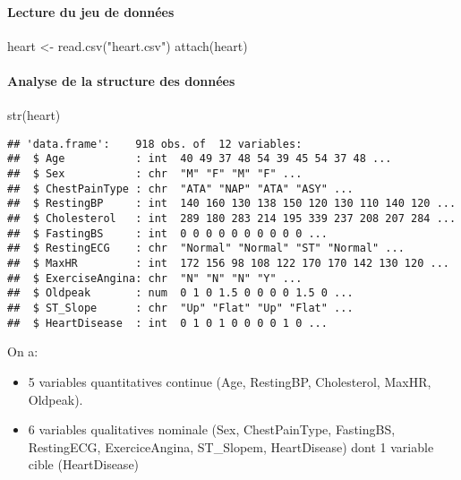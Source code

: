 \documentclass[
]{article}
\newenvironment{Shaded}{\begin{snugshade}}{\end{snugshade}}
\newcommand{\FunctionTok}[1]{\textcolor[rgb]{0.00,0.00,0.00}{#1}}
\newcommand{\NormalTok}[1]{#1}
\newcommand{\OtherTok}[1]{\textcolor[rgb]{0.56,0.35,0.01}{#1}}
\newcommand{\StringTok}[1]{\textcolor[rgb]{0.31,0.60,0.02}{#1}}
\providecommand{\tightlist}{%
  \setlength{\itemsep}{0pt}\setlength{\parskip}{0pt}}
\begin{document}
\hypertarget{lecture-du-jeu-de-donnuxe9es}{%
\paragraph{Lecture du jeu de
données}\label{lecture-du-jeu-de-donnuxe9es}}

\begin{Shaded}
\begin{Highlighting}[]
\NormalTok{heart }\OtherTok{\textless{}{-}} \FunctionTok{read.csv}\NormalTok{(}\StringTok{"heart.csv"}\NormalTok{)}
\FunctionTok{attach}\NormalTok{(heart)}
\end{Highlighting}
\end{Shaded}

\hypertarget{analyse-de-la-structure-des-donnuxe9es}{%
\paragraph{Analyse de la structure des
données}\label{analyse-de-la-structure-des-donnuxe9es}}

\begin{Shaded}
\begin{Highlighting}[]
\FunctionTok{str}\NormalTok{(heart)}
\end{Highlighting}
\end{Shaded}

\begin{verbatim}
## 'data.frame':    918 obs. of  12 variables:
##  $ Age           : int  40 49 37 48 54 39 45 54 37 48 ...
##  $ Sex           : chr  "M" "F" "M" "F" ...
##  $ ChestPainType : chr  "ATA" "NAP" "ATA" "ASY" ...
##  $ RestingBP     : int  140 160 130 138 150 120 130 110 140 120 ...
##  $ Cholesterol   : int  289 180 283 214 195 339 237 208 207 284 ...
##  $ FastingBS     : int  0 0 0 0 0 0 0 0 0 0 ...
##  $ RestingECG    : chr  "Normal" "Normal" "ST" "Normal" ...
##  $ MaxHR         : int  172 156 98 108 122 170 170 142 130 120 ...
##  $ ExerciseAngina: chr  "N" "N" "N" "Y" ...
##  $ Oldpeak       : num  0 1 0 1.5 0 0 0 0 1.5 0 ...
##  $ ST_Slope      : chr  "Up" "Flat" "Up" "Flat" ...
##  $ HeartDisease  : int  0 1 0 1 0 0 0 0 1 0 ...
\end{verbatim}

On a:

\begin{itemize}
\tightlist
\item
  5 variables quantitatives continue (Age, RestingBP, Cholesterol,
  MaxHR, Oldpeak).
\item
  6 variables qualitatives nominale (Sex, ChestPainType, FastingBS,
  RestingECG, ExerciceAngina, ST\_Slopem, HeartDisease) dont 1 variable
  cible (HeartDisease)
\end{itemize}
\end{document}

